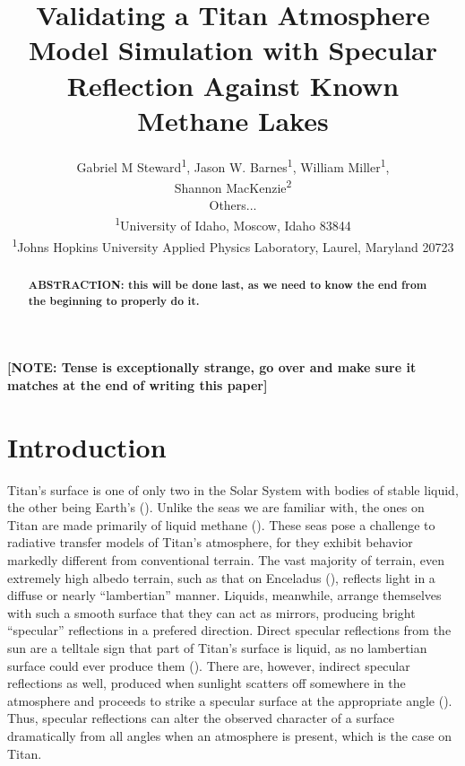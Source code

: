 \documentclass{article}
\title{\textbf{Validating a Titan Atmosphere Model Simulation with Specular Reflection Against Known Methane Lakes}}
\author{Gabriel M Steward\textsuperscript{1}, Jason W. Barnes\textsuperscript{1}, William Miller\textsuperscript{1}, \\ Shannon MacKenzie\textsuperscript{2} \\Others... \\
		{\scriptsize \textsuperscript{1}University of Idaho, Moscow, Idaho 83844}\\
		{\scriptsize \textsuperscript{1}Johns Hopkins University Applied Physics Laboratory, Laurel, Maryland 20723}
}
\begin{document}
\pagestyle{fancy}
\fancyhead{}
\maketitle

\begin{abstract}
\textbf{\color{red}ABSTRACTION: this will be done last, as we need to know the end from the beginning to properly do it.\color{black}}
\end{abstract}

\textbf{\color{red} [NOTE: Tense is exceptionally strange, go over and make sure it matches at the end of writing this paper] \color{black}}
 

\section{Introduction}
Titan's surface is one of only two in the Solar System with bodies of stable liquid, the other being Earth's (\cite{Hayes2016}). Unlike the seas we are familiar with, the ones on Titan are made primarily of liquid methane (\cite{Mastrogiuseppe2016}). These seas pose a challenge to radiative transfer models of Titan's atmosphere, for they exhibit behavior markedly different from conventional terrain. The vast majority of terrain, even extremely high albedo terrain, such as that on Enceladus (\cite{Li2023}), reflects light in a diffuse or nearly ``lambertian'' manner. Liquids, meanwhile, arrange themselves with such a smooth surface that they can act as mirrors, producing bright ``specular'' reflections in a prefered direction. Direct specular reflections from the sun are a telltale sign that part of Titan's surface is liquid, as no lambertian surface could ever produce them (\cite{Stephan2010}). There are, however, indirect specular reflections as well, produced when sunlight scatters off somewhere in the atmosphere and proceeds to strike a specular surface at the appropriate angle (\cite{Vixie2015}). Thus, specular reflections can alter the observed character of a surface dramatically from all angles when an atmosphere is present, which is the case on Titan.
\end{document}
